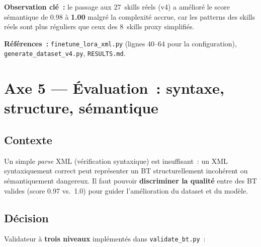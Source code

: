 \documentclass[a4paper,11pt]{article}
\newcommand{\file}[1]{\texttt{#1}}
\begin{document}
\textbf{Observation clé~:} le passage aux 27~skills réels (v4) a amélioré
le score sémantique de 0.98 à \textbf{1.00} malgré la complexité accrue, car
les patterns des skills réels sont plus réguliers que ceux des 8~skills
proxy simplifiés.

\textbf{Références~:} \file{finetune\_lora\_xml.py} (lignes 40--64 pour la
configuration), \file{generate\_dataset\_v4.py}, \file{RESULTS.md}.

\newpage
\section{Axe 5 --- Évaluation~: syntaxe, structure, sémantique}
\label{sec:evaluation}

\subsection{Contexte}

Un simple \emph{parse} XML (vérification syntaxique) est insuffisant~: un
XML syntaxiquement correct peut représenter un BT structurellement incohérent
ou sémantiquement dangereux. Il faut pouvoir \textbf{discriminer la qualité}
entre des BT valides (score 0.97 vs.\ 1.0) pour guider l'amélioration du
dataset et du modèle.

\subsection{Décision}

Validateur à \textbf{trois niveaux} implémentés dans
\file{validate\_bt.py}~:
\end{document}

